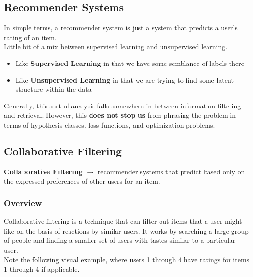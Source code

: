 \documentclass[english, 10pt]{article}
\begin{document}
\subsection{Recommender Systems}

In simple terms, a recommender system is just a system that predicts a user's rating of an item.\\

Little bit of a mix between supervised learning and unsupervised learning.
\begin{itemize}
	\item Like \textbf{Supervised Learning} in that we have some semblance of labels there
	\item Like \textbf{Unsupervised Learning} in that we are trying to find some latent structure within the data
\end{itemize}

Generally, this sort of analysis falls somewhere in between information filtering and retrieval. However, this \textbf{does not stop us} from phrasing the problem in terms of hypothesis classes, loss functions, and optimization problems.

\subsection{Collaborative Filtering}

\begin{tcolorbox}[title=Definition:,colframe=red!75!black,colback=red!5!white,arc=0pt,fonttitle=\bfseries]
\textbf{Collaborative Filtering} $\rightarrow$ recommender systems that predict based only on the expressed preferences of other users for an item. 
\end{tcolorbox}

\subsubsection{Overview}
\hfill \break Collaborative filtering is a technique that can filter out items that a user might like on the basis of reactions by similar users. It works by searching a large group of people and finding a smaller set of users with tastes similar to a particular user.\\

Note the following visual example, where users 1 through 4 have ratings for items 1 through 4 if applicable.\\
\end{document}
